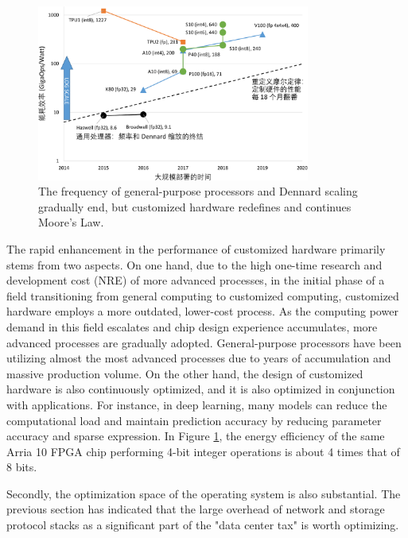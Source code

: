 \begin{figure}[htbp]
	\centering
	\includegraphics[width=0.8\textwidth]{figures/moores_law_redefined.pdf}
	\caption{The frequency of general-purpose processors and Dennard scaling gradually end, but customized hardware redefines and continues Moore's Law.}
	\label{background:fig:moores_law_redefined}
\end{figure}

The rapid enhancement in the performance of customized hardware primarily stems from two aspects. On one hand, due to the high one-time research and development cost (NRE) of more advanced processes, in the initial phase of a field transitioning from general computing to customized computing, customized hardware employs a more outdated, lower-cost process. As the computing power demand in this field escalates and chip design experience accumulates, more advanced processes are gradually adopted. General-purpose processors have been utilizing almost the most advanced processes due to years of accumulation and massive production volume. On the other hand, the design of customized hardware is also continuously optimized, and it is also optimized in conjunction with applications. For instance, in deep learning, many models can reduce the computational load and maintain prediction accuracy by reducing parameter accuracy and sparse expression. In Figure \ref{background:fig:moores_law_redefined}, the energy efficiency of the same Arria 10 FPGA chip performing 4-bit integer operations is about 4 times that of 8 bits.

Secondly, the optimization space of the operating system is also substantial. The previous section has indicated that the large overhead of network and storage protocol stacks as a significant part of the "data center tax" is worth optimizing.

